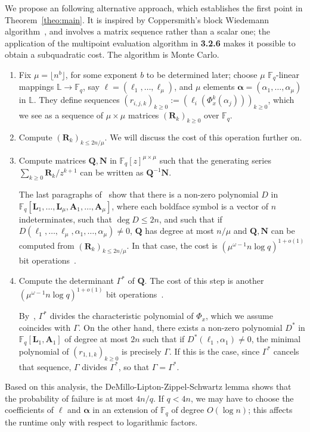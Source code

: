 \documentclass[sigconf]{acmart}
\newcommand{\F}{\mathbb{F}}
\renewcommand{\L}{\mathbb{L}}
\begin{document}
We propose an following alternative approach, which establishes the
first point in Theorem~\ref{theo:main}.  It is inspired by
Coppersmith's block Wiedemann algorithm~\cite{Coppersmith94}, and
involves a matrix sequence rather than a scalar one; the application
of the multipoint evaluation algorithm in {\bf 3.2.6} makes it
possible to obtain a subquadratic cost.  The algorithm is Monte Carlo.
\begin{enumerate}
\item Fix $\mu=\lfloor n^{b} \rfloor$, for some exponent $b$ to be
  determined later; choose $\mu$ $\F_q$-linear mappings $\L\to\F_q$,
  say ${\bm \ell}=(\ell_1,\dots,\ell_\mu)$, and $\mu$ elements ${\bm
    \alpha}=(\alpha_1,\dots,\alpha_\mu)$ in $\L$.  They define
  sequences $(r_{i,j,k})_{k \ge 0} := (\ell_i(\Phi_x^k(\alpha_j)))_{k
    \ge 0}$, which we see as a sequence of $\mu \times \mu$ matrices
  $({\bm R}_k)_{k \ge 0}$ over $\F_q$.
\item Compute $({\bm R}_k)_{k \le 2n/\mu}$. We will discuss 
  the cost of this operation further on.
\item Compute matrices ${\bm Q}, {\bm N}$ in $\F_q[z]^{\mu \times
  \mu}$ such that the generating series $\sum_{k \ge 0} {\bm R}_k /
  z^{k+1}$ can be written as ${\bm Q}^{-1}{\bm N}$. 

  The last paragraphs of~\cite[Sec.~2.1]{KaVi04} show that there is
  a non-zero polynomial $D$ in $\F_q[{\bm L}_1,\dots,{\bm L}_\mu,{\bm
      A}_1,\dots,{\bm A}_\mu]$, where each boldface symbol is a vector
  of $n$ indeterminates, such that $\deg D \le 2n$, and such that if
  $D({\ell}_1,\dots,{\ell}_\mu,{\alpha}_1,\dots,{\alpha}_\mu)\ne 0$,
  ${\bm Q}$ has degree at most $n/\mu$  and ${\bm Q}, {\bm N}$ can be
  computed  from $({\bm R}_k)_{k \le 2n/\mu}$.  In that case,
  the cost is $(\mu^{\omega-1} n \log q)^{1+o(1)}$ bit
  operations~\cite{GiJeVi03}. 
  

\item Compute the determinant $\Gamma^*$ of ${\bm Q}$.  The cost of this step is
  another $(\mu^{\omega-1} n \log q)^{1+o(1)}$ bit
  operations~\cite{LaNeZh17}.
  
  By~\cite[Th.~2.12]{KaVi04}, $\Gamma^*$ divides the characteristic
  polynomial of $\Phi_x$, which we assume coincides with $\Gamma$. On
  the other hand, there exists a non-zero polynomial $D^*$ in
  $\F_q[{\bm L}_1,{\bm A}_1]$ of degree at most $2n$ such that if
  $D^*({\ell}_1,{\alpha}_1)\ne 0$, the minimal polynomial of
  $(r_{1,1,k})_{k \ge 0}$ is precisely $\Gamma$. If this is the case,
  since $\Gamma^*$ cancels that sequence, $\Gamma$ divides $\Gamma^*$,
  so that $\Gamma = \Gamma^*$.
\end{enumerate}
Based on this analysis, the DeMillo-Lipton-Zippel-Schwartz lemma shows
that the probability of failure is at most $4n/q$. If $q < 4n$,
we may have to choose the coefficients of ${\bm \ell}$ and ${\bm
  \alpha}$ in an extension of $\F_q$ of degree $O(\log n)$; this
affects the runtime only with respect to logarithmic factors.
\end{document}
